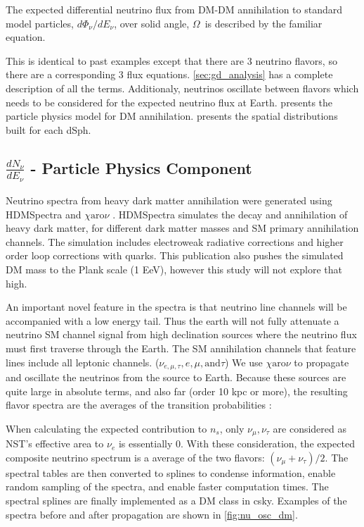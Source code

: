 The expected differential neutrino flux from DM-DM annihilation to standard model
particles, $d\Phi_{\nu}/dE_{\nu}$, over solid angle, $\Omega$~is described by the familiar equation.
\iddmannilation[\nu]

This is identical to past examples except that there are 3 neutrino flavors, so there are a corresponding 3 flux equations.
\cref{sec:gd_analysis} has a complete description of all the terms.
Additionaly, neutrinos oscillate between flavors which needs to be considered for the expected neutrino flux at Earth.
 presents the particle physics model for DM annihilation.
 presents the spatial distributions built for each dSph.

\subsection{$\frac{dN_\nu}{dE_\nu}$ - Particle Physics Component}\label{sec:icDM_particlephysics}

Neutrino spectra from heavy dark matter annihilation were generated using HDMSpectra \cite{HDMSpectra} and $\chi \textrm{aro}\nu$ \cite{Charon}.
HDMSpectra simulates the decay and annihilation of heavy dark matter, for different dark matter masses and SM primary annihilation channels.
The simulation includes electroweak radiative corrections and higher order loop corrections with quarks.
This publication also pushes the simulated DM mass to the Plank scale (1 EeV), however this study will not explore that high.

An important novel feature in the spectra is that neutrino line channels will be accompanied with a low energy tail.
Thus the earth will not fully attenuate a neutrino SM channel signal from high declination sources where the neutrino flux must first traverse through the Earth.
The SM annihilation channels that feature lines include all leptonic channels. ($\nu_{e,\mu,\tau}, e, \mu, \mathrm{and} \tau$)
We use \href{https://iopscience.iop.org/article/10.1088/1475-7516/2020/10/043}{ $\chi \mathrm{aro}\nu$} to propagate and oscillate the neutrinos from the source to Earth.
Because these sources are quite large in absolute terms, and also far (order 10 kpc or more), the resulting flavor spectra are the averages of the transition probabilities \cite{Charon}:
\nuOscMatrix

When calculating the expected contribution to $n_s$, only $ \nu_\mu, \nu_\tau $ are considered as NST's effective area to $ \nu_e $ is essentially 0.
With these consideration, the expected composite neutrino spectrum is a average of the two flavors: $ (\nu_\mu + \nu_\tau)/2 $.
The spectral tables are then converted to splines to condense information, enable random sampling of the spectra, and enable faster computation times.
The spectral splines are finally implemented as a DM class in csky.
Examples of the spectra before and after propagation are shown in \cref{fig:nu_osc_dm}.



